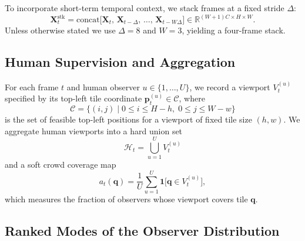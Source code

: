 \documentclass[preprint,12pt]{elsarticle}
\begin{document}
To incorporate short-term temporal context, we stack frames at a fixed 
stride $\Delta$:
\begin{equation}
  \mathbf{X}^{\text{stk}}_t 
    = \text{concat}\bigl[\mathbf{X}_t,\,\mathbf{X}_{t-\Delta},\,
      \ldots,\,\mathbf{X}_{t-W\Delta}\bigr]
    \in \mathbb{R}^{(W+1)C \times H \times W}.
  \label{eq:stacking}
\end{equation}
Unless otherwise stated we use $\Delta = 8$ and $W = 3$, yielding a 
four-frame stack.

\subsection{Human Supervision and Aggregation}

For each frame $t$ and human observer $u \in \{1,\ldots,U\}$, we record a 
viewport $V^{(u)}_t$ specified by its top-left tile coordinate 
$\mathbf{p}^{(u)}_t \in \mathcal{C}$, where
\begin{equation}
  \mathcal{C} = \{(i,j) \mid 0 \le i \le H - h,\; 0 \le j \le W - w\}
  \label{eq:feasible}
\end{equation}
is the set of feasible top-left positions for a viewport of fixed tile size 
$(h, w)$. We aggregate human viewports into a hard union set
\begin{equation}
  \mathcal{H}_t = \bigcup_{u=1}^{U} V^{(u)}_t
  \label{eq:union}
\end{equation}
and a soft crowd coverage map
\begin{equation}
  a_t(\mathbf{q}) = \frac{1}{U} \sum_{u=1}^{U} 
    \mathbf{1}\!\bigl[\mathbf{q} \in V^{(u)}_t\bigr],
  \label{eq:coverage}
\end{equation}
which measures the fraction of observers whose viewport covers tile
$\mathbf{q}$.

\subsection{Ranked Modes of the Observer Distribution}
\label{subsec:modes}
\end{document}
